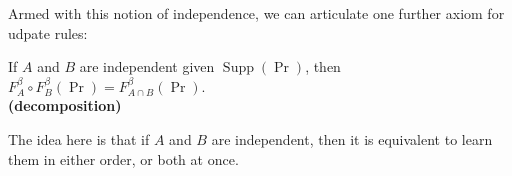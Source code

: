 \documentclass{article}
\DeclareMathOperator{\supp}{\mathrm{Supp}}
\begin{document}
\begin{wip}
\begin{enumerate}
\end{enumerate}

Armed with this notion of independence, we can articulate one further axiom for udpate rules:
\begin{CFaxioms}
    \item
    If $A$ and $B$ are independent given $\supp(\Pr)$, then
    $F^{\beta}_A \circ F^{\beta}_B (\Pr) = F^{\beta}_{A \cap B}(\Pr)$. \\
        \hfill \textbf{(decomposition)}
\end{CFaxioms}
The idea here is that if $A$ and $B$ are independent, then it is equivalent to learn them in either order, or both at once.




\end{wip}
\end{document}
